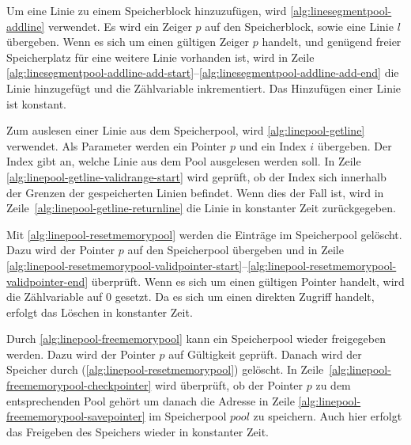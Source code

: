 



Um eine Linie zu einem Speicherblock hinzuzufügen, wird \autoref{alg:linesegmentpool-addline} verwendet. Es wird ein Zeiger
 $p$ auf den Speicherblock, sowie eine Linie $l$ übergeben. Wenn es sich um einen gültigen Zeiger $p$ handelt, und
 genügend freier Speicherplatz für eine weitere Linie vorhanden ist, wird in Zeile
 \ref{alg:linesegmentpool-addline-add-start}--\ref{alg:linesegmentpool-addline-add-end} die Linie hinzugefügt und die
 Zählvariable inkrementiert. Das Hinzufügen einer Linie ist konstant.



Zum auslesen einer Linie aus dem Speicherpool, wird \autoref{alg:linepool-getline} verwendet. Als Parameter werden ein
 Pointer $p$ und ein Index $i$ übergeben. Der Index gibt an, welche Linie aus dem Pool ausgelesen werden soll. In Zeile
 \ref{alg:linepool-getline-validrange-start} wird geprüft, ob der Index sich innerhalb der Grenzen der gespeicherten
 Linien befindet. Wenn dies der Fall ist, wird in Zeile~\ref{alg:linepool-getline-returnline} die Linie in konstanter
 Zeit zurückgegeben.



Mit \autoref{alg:linepool-resetmemorypool} werden die Einträge im Speicherpool gelöscht. Dazu wird der Pointer $p$ auf
 den Speicherpool übergeben und in Zeile
 \ref{alg:linepool-resetmemorypool-validpointer-start}--\ref{alg:linepool-resetmemorypool-validpointer-end} überprüft.
 Wenn es sich um einen gültigen Pointer handelt, wird die Zählvariable auf $0$ gesetzt. Da es sich um einen direkten
 Zugriff handelt, erfolgt das Löschen in konstanter Zeit.



Durch \autoref{alg:linepool-freememorypool} kann ein Speicherpool wieder freigegeben werden. Dazu wird der Pointer $p$
 auf Gültigkeit geprüft. Danach wird der Speicher durch 
 (\autoref{alg:linepool-resetmemorypool}) gelöscht. In Zeile~\ref{alg:linepool-freememorypool-checkpointer} wird
 überprüft, ob der Pointer $p$ zu dem entsprechenden Pool gehört um danach die Adresse in Zeile
 \ref{alg:linepool-freememorypool-savepointer} im Speicherpool $\mathit{pool}$ zu speichern. Auch hier erfolgt das
 Freigeben des Speichers wieder in konstanter Zeit.

